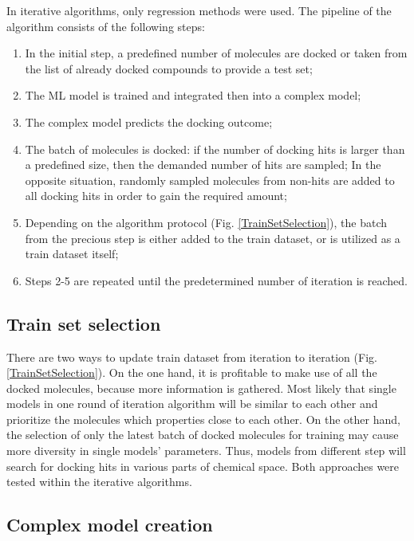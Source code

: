 In iterative algorithms, only regression methods were used.
The pipeline of the algorithm consists of the following steps:
\begin{enumerate}
    \item In the initial step, a predefined number of molecules are docked or taken from the list of already docked compounds to provide a test set;
    \item The ML model is trained and integrated then into a complex model;
    \item The complex model predicts the docking outcome;
    \item The batch of molecules is docked: if the number of docking hits is larger than a predefined size, then the demanded number of hits are sampled;
    In the opposite situation, randomly sampled molecules from non-hits are added 
to all docking hits in order to gain the required amount;
    \item Depending on the algorithm protocol (Fig. \ref{TrainSetSelection}), the batch from the precious step is either added to the train dataset, or is utilized as a train dataset itself;
    \item Steps 2-5 are repeated until the predetermined number of iteration is reached.
\end{enumerate}

\subsection{Train set selection}
There are two ways to update train dataset from iteration to iteration (Fig. \ref{TrainSetSelection}).
On the one hand, it is profitable to make use of all the docked molecules, because 
more information is gathered.
Most likely that single models in one round of iteration algorithm will be similar 
to each other and prioritize the molecules which properties close to each other.
On the other hand, the selection of only the latest batch of docked molecules for 
training may cause more diversity in single models' parameters.
Thus, models from different step will search for docking hits in various parts of 
chemical space.
Both approaches were tested within the iterative algorithms.\\

\subsection{Complex model creation}


